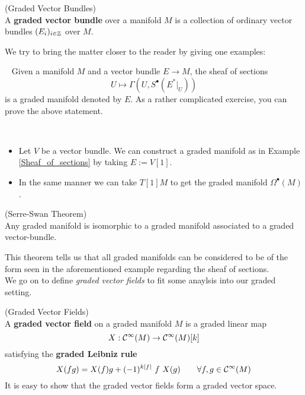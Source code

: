 \begin{definition} (Graded Vector Bundles)\\
  A \textbf{graded vector bundle} over a manifold $M$ is a collection of ordinary vector bundles $(E_i)_{i\in \mathbb{Z}}$ over $M$.
\end{definition}

We try to bring the matter closer to the reader by giving one examples:

\begin{example}~
\label{Sheaf_of_sections}
  Given a manifold $M$ and a vector bundle $E\longrightarrow M$, the sheaf of sections
  $$ U \mapsto \Gamma(U, S^\bullet(E^*|_U)) $$
  is a graded manifold denoted by $E$. As a rather complicated exercise, you can prove the above statement.
\end{example}

\begin{example}~
\begin{itemize}
  \item Let $V$ be a vector bundle. We can construct a graded manifold as in Example \ref{Sheaf_of_sections} by taking $E:= V[1]$.

  \item In the same manner we can take $T[1]M$ to get the graded manifold $\Omega^\bullet(M)$.
\end{itemize}
\end{example}

\begin{theo} (Serre-Swan Theorem)\\
  Any graded manifold is isomorphic to a graded manifold associated to a graded vector-bundle.
\end{theo}

This theorem tells us that all graded manifolds can be considered to be of the form seen in the aforementioned example regarding the sheaf of sections.\\

We go on to define \emph{graded vector fields} to fit some anaylsis into our graded setting.

\begin{definition} (Graded Vector Fields)\\
  A \textbf{graded vector field} on a graded manifold $M$ is a graded linear map
  $$ X:\mathcal{C}^{\infty}(M) \rightarrow \mathcal{C}^{\infty}(M)[k] $$
  satisfying the \textbf{graded Leibniz rule}
  $$ X(fg) = X(f) g + (-1)^{k|f|} \ f \ X(g) \quad \quad \forall f,g \in \mathcal{C}^{\infty}(M)$$
  It is easy to show that the graded vector fields form a graded vector space.
\end{definition}

